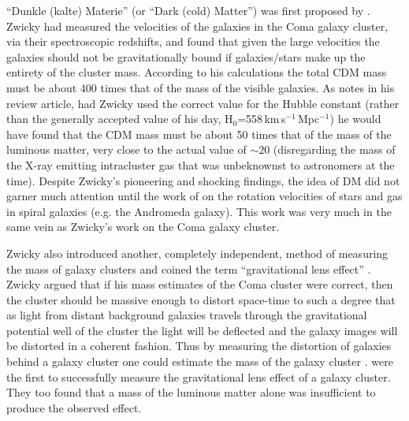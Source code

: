 ``Dunkle (kalte) Materie'' (or ``Dark (cold) Matter'') was first proposed by \citet{Zwicky:1933ub}.
Zwicky had measured the velocities of the galaxies in the Coma galaxy cluster, via their spectroscopic redshifts, and found that given the large velocities the galaxies should not be gravitationally bound if galaxies/stars make up the entirety of the cluster mass.
According to his calculations the total CDM mass must be about 400 times that of the mass of the visible galaxies. 
As \citet{vandenBergh:1999jf} notes in his review article, had Zwicky used the correct value for the Hubble constant (rather than the generally accepted value of his day, H$_0$=558\,km\,s$^{-1}$\,Mpc$^{-1}$) he would have found that the CDM mass must be about 50 times that of the mass of the luminous matter, very close to the actual value of $\sim20$ (disregarding the mass of the X-ray emitting intracluster gas that was unbeknownst to astronomers at the time).
Despite Zwicky's pioneering and shocking findings, the idea of DM did not garner much attention until the work of \citet{Rubin:1970gu} on the rotation velocities of stars and gas in spiral galaxies (e.g. the Andromeda galaxy).
This work was very much in the same vein as Zwicky's work on the Coma galaxy cluster. 

Zwicky also introduced another, completely independent, method of measuring the mass of galaxy clusters and coined the term ``gravitational lens effect'' \citep{Zwicky:1937ec}.
Zwicky argued that if his mass estimates of the Coma cluster were correct, then the cluster should be massive enough to distort space-time to such a degree that as light from distant background galaxies travels through the gravitational potential well of the cluster the light will be deflected and the galaxy images will be distorted in a coherent fashion.
Thus by measuring the distortion of galaxies behind a galaxy cluster one could estimate the mass of the galaxy cluster \citep[see Chapter 2 of][for an introduction to weak gravitational lensing]{Courbin:2002wh}.
\citet{Tyson:1990bc} were the first to successfully measure the gravitational lens effect of a galaxy cluster.
They too found that a mass of the luminous matter alone was insufficient to produce the observed effect.

